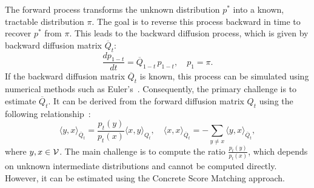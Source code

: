   The forward process transforms the unknown distribution $p^*$ into a known, tractable distribution $\pi$. The goal is to reverse this process backward in time to recover $p^*$ from $\pi$. This leads to the backward diffusion process, which is given by backward diffusion matrix $\overline{Q}_t$:
  \begin{equation}
    \frac{dp_{1-t}}{dt} = \overline{Q}_{1-t} \, p_{1-t}, \quad p_1 = \pi. 
      \label{eq:backward diffusion}
  \end{equation}
  If the backward diffusion matrix $\overline{Q}_t$ is known, this process can be simulated using numerical methods such as Euler's~\citep{lou2024discrete}.
  Consequently, the primary challenge is to estimate $\overline{Q}_t.$
  It can be derived from the forward diffusion matrix $Q_t$ using the following relationship~\citep{kelly2011reversibility, campbell2022continuous, sun2022score}:
  \begin{equation*}
    \langle y, x\rangle_{\overline{Q}_{t}} = \frac{p_t(y)}{p_t(x)} \langle x, y \rangle_{Q_t}, \quad 
    \langle x, x\rangle_{\overline{Q}_{t}} = - \sum_{y \neq x} \langle y, x \rangle_{\overline{Q}_{t}},
  \end{equation*}
  where $y, x \in \mathcal{V}$. The main challenge is to compute the ratio $\frac{p_t(y)}{p_t(x)}$, which depends on unknown intermediate distributions and cannot be computed directly. However, it can be estimated using the Concrete Score Matching approach.

